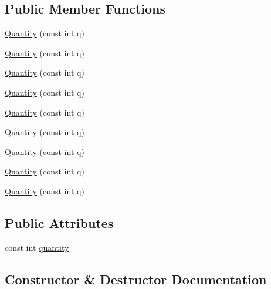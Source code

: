 \subsection*{Public Member Functions}
\begin{DoxyCompactItemize}
\item 
\mbox{\hyperlink{structfakeit_1_1Quantity_a2927b1f285ec2edd27a7fd1d947a1506}{Quantity}} (const int q)
\item 
\mbox{\hyperlink{structfakeit_1_1Quantity_a2927b1f285ec2edd27a7fd1d947a1506}{Quantity}} (const int q)
\item 
\mbox{\hyperlink{structfakeit_1_1Quantity_a2927b1f285ec2edd27a7fd1d947a1506}{Quantity}} (const int q)
\item 
\mbox{\hyperlink{structfakeit_1_1Quantity_a2927b1f285ec2edd27a7fd1d947a1506}{Quantity}} (const int q)
\item 
\mbox{\hyperlink{structfakeit_1_1Quantity_a2927b1f285ec2edd27a7fd1d947a1506}{Quantity}} (const int q)
\item 
\mbox{\hyperlink{structfakeit_1_1Quantity_a2927b1f285ec2edd27a7fd1d947a1506}{Quantity}} (const int q)
\item 
\mbox{\hyperlink{structfakeit_1_1Quantity_a2927b1f285ec2edd27a7fd1d947a1506}{Quantity}} (const int q)
\item 
\mbox{\hyperlink{structfakeit_1_1Quantity_a2927b1f285ec2edd27a7fd1d947a1506}{Quantity}} (const int q)
\item 
\mbox{\hyperlink{structfakeit_1_1Quantity_a2927b1f285ec2edd27a7fd1d947a1506}{Quantity}} (const int q)
\end{DoxyCompactItemize}
\subsection*{Public Attributes}
\begin{DoxyCompactItemize}
\item 
const int \mbox{\hyperlink{structfakeit_1_1Quantity_a196c6b7acb7bfeb71906aa66f20eb272}{quantity}}
\end{DoxyCompactItemize}


\subsection{Constructor \& Destructor Documentation}
\mbox{\label{structfakeit_1_1Quantity_a2927b1f285ec2edd27a7fd1d947a1506}} 
